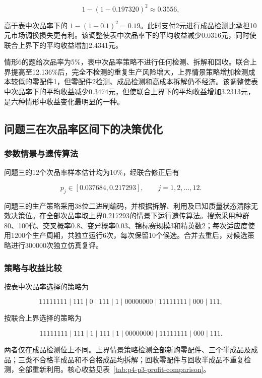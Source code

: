 \documentclass{cumcm}
\numberwithin{figure}{section}
\numberwithin{table}{section}
\begin{document}
\[
1-(1-0.197320)^2\approx0.3556,
\]

高于表中次品率下的 \(1-(1-0.1)^2=0.19\)。此时支付2元进行成品检测比承担10元市场调换损失更有利。该调整使表中次品率下的平均收益减少0.0316元，同时使联合上界下的平均收益增加2.4341元。

情形6的题给次品率为5\%，表中次品率策略不进行任何检测、拆解和回收。联合上界提高至12.136\%后，完全不检测的重复生产风险增大，上界情景策略增加检测成本较低的零配件1，但零配件2检测、成品检测和高成本拆解仍不经济。该调整使表中次品率下的平均收益减少0.3474元，但使联合上界下的平均收益增加3.2313元，是六种情形中收益变化最明显的一种。

\subsection{问题三在次品率区间下的决策优化}\label{ux95eeux9898ux4e09ux5728ux6b21ux54c1ux7387ux533aux95f4ux4e0bux7684ux51b3ux7b56ux4f18ux5316}

\subsubsection{参数情景与遗传算法}\label{ux53c2ux6570ux60c5ux666fux4e0eux9057ux4f20ux7b97ux6cd5}

问题三的12个次品率样本估计均为10\%，经联合修正后有

\[
p_j\in[0.037684,0.217293],\qquad j=1,2,\ldots,12.
\]

问题三的生产策略采用38位二进制编码，并根据拆解、利用及已知质量状态清除无效决策位。在全部次品率取上界0.217293的情景下运行遗传算法。搜索采用种群80、100代、交叉概率0.8、变异概率0.03、锦标赛规模3和精英数2；每次适应度使用1200个生产周期，共独立运行6次，每次保留10个候选。合并去重后，对候选策略进行300000次独立仿真复评。

\subsubsection{策略与收益比较}\label{ux7b56ux7565ux4e0eux6536ux76caux6bd4ux8f83}

按表中次品率选择的策略为

\[
11111111\mid111\mid0\mid111\mid1
\mid00000000\mid11111111\mid000\mid111,
\]

按联合上界选择的策略为

\[
11111111\mid111\mid1\mid111\mid1
\mid00000000\mid11111111\mid000\mid111.
\]

两者仅在成品检测位上不同。上界情景策略检测全部新购零配件、三个半成品及成品；三类不合格半成品和不合格成品均拆解；回收零配件与回收半成品不重复检测，全部重新利用。核心收益见表~\ref{tab:p4-p3-profit-comparison}。
\end{document}
